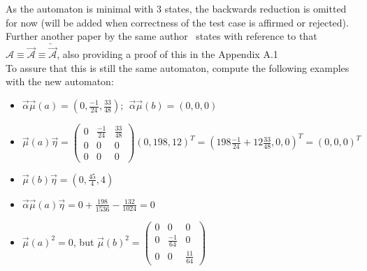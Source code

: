         As the automaton is minimal with 3 states, the backwards reduction is omitted for now (will be added when correctness of the test case is affirmed or rejected). Further another paper by the same author~\autocite{kiefer2014stability} states with reference to \autocite{schutz} that $\mathcal{A} \equiv \overrightarrow{\mathcal{A}} \equiv \overleftarrow{\overrightarrow{\mathcal{A}}} $, also providing a proof of this in the Appendix A.1 \\
        
        To assure that this is still the same automaton, compute the following examples with the new automaton:
        \begin{itemize}
            \item $\overrightarrow{\alpha} \overrightarrow{\mu}(a) = (0,\frac{-1}{24}, \frac{33}{48}); \ \ \overrightarrow{\alpha} \overrightarrow{\mu}(b) = (0,0,0)$
            
            \item $ \overrightarrow{\mu}(a) \overrightarrow{\eta} = \begin{pmatrix}
                    0 & \frac{-1}{24} & \frac{33}{48} \\
                    0 & 0 & 0 \\
                    0 & 0 & 0 
                \end{pmatrix}  (0, 198, 12)^T = (198\frac{-1}{24} + 12\frac{33}{48}, 0, 0)^T = (0,0,0)^T $
            
            \item $ \overrightarrow{\mu}(b) \overrightarrow{\eta} = (0, \frac{45}{4}, 4)$
            
            \item $\overrightarrow{\alpha} \overrightarrow{\mu}(a) \overrightarrow{\eta} = 0 + \frac{198}{1536} - \frac{132}{1024} = 0$
                
            \item $\overrightarrow{\mu}(a)^2 = 0$, but $\overrightarrow{\mu}(b)^2 =  \begin{pmatrix}
                    0 & 0 & 0 \\
                    0 & \frac{-1}{64} & 0 \\
                    0 & 0 & \frac{11}{64} 
                \end{pmatrix}$
                

\end{itemize}
